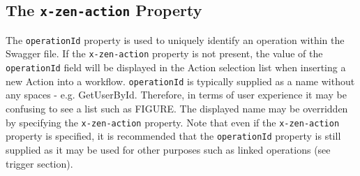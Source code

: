\subsection{The \texttt{x-zen-action} Property}
The \texttt{operationId} property is used to uniquely identify an operation within the Swagger file. If the \texttt{x-zen-action} property is not present, the value of the \texttt{operationId} field will be displayed in the Action selection list when inserting a new Action into a workflow. \texttt{operationId} is typically supplied as a name without any spaces - e.g. GetUserById. Therefore, in terms of user experience it may be confusing to see a list such as FIGURE. The displayed name may be overridden by specifying the \texttt{x-zen-action} property. Note that even if the \texttt{x-zen-action} property is specified, it is recommended that the \texttt{operationId} property is still supplied as it may be used for other purposes such as linked operations (see trigger section).